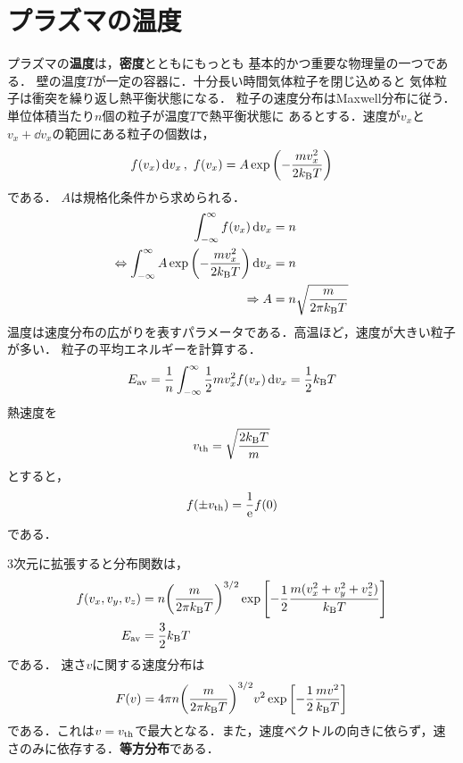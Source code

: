 \documentclass{report}
\begin{document}
  \section{プラズマの温度}
    プラズマの\textbf{温度}は，\textbf{密度}とともにもっとも
    基本的かつ重要な物理量の一つである．
    壁の温度$T$が一定の容器に．十分長い時間気体粒子を閉じ込めると
    気体粒子は衝突を繰り返し熱平衡状態になる．
    粒子の速度分布はMaxwell分布に従う．単位体積当たり$n$個の粒子が温度$T$で熱平衡状態に
    あるとする．速度が$v_x$と$v_x + \dd{v_x}$の範囲にある粒子の個数は，
    \begin{align}
      f(v_x)\dd{v_x},\ f(v_x) = A \exp\qty(-\frac{mv_x^2}{2k_{\mathrm{B}} T})
    \end{align}
    である．
    $A$は規格化条件から求められる．
    \begin{align}
      \int_{-\infty}^{\infty} f(v_x) \dd{v_x} &= n \\
      \Leftrightarrow \int_{-\infty}^{\infty} A \exp\qty(-\frac{mv_x^2}{2k_{\mathrm{B}} T})\dd{v_x} &= n \\ 
      \Rightarrow A &= n\sqrt{\frac{m}{2\pi k_{\mathrm{B}} T}}
    \end{align}
    温度は速度分布の広がりを表すパラメータである．高温ほど，速度が大きい粒子が多い．
    粒子の平均エネルギーを計算する．
    \begin{align}
      E_{\mathrm{av}} = \frac{1}{n}\int_{-\infty}^{\infty} \frac{1}{2}mv_x^2f(v_x) \dd{v_x} = \frac{1}{2}k_{\mathrm{B}} T
    \end{align}
    熱速度を
    \begin{align}
      v_{\mathrm{th}} = \sqrt{\frac{2k_{\mathrm{B}} T}{m}}
    \end{align}
    とすると，
    \begin{align}
      f(\pm v_{\mathrm{th}}) = \frac{1}{\mathrm{e}}f(0)
    \end{align}
    である．
    \par
    3次元に拡張すると分布関数は，
    \begin{align}
      f(v_x, v_y, v_z) &= n\qty(\frac{m}{2\pi k_{\mathrm{B}} T})^{3/2} \exp\qty[-\frac{1}{2}\frac{m(v_x^2 + v_y^2 + v_z^2)}{k_{\mathrm{B}} T}]\\
      E_{\mathrm{av}} &= \frac{3}{2}k_{\mathrm{B}} T
    \end{align}
    である．
    速さ$v$に関する速度分布は
    \begin{align}
      F(v) = 4\pi n \qty(\frac{m}{2\pi k_{\mathrm{B}} T})^{3/2} v^2 \exp\qty[-\frac{1}{2}\frac{mv^2}{k_{\mathrm{B}} T}]
    \end{align}
    である．これは$v = v_{\mathrm{th}}$で最大となる．また，速度ベクトルの向きに依らず，速さのみに依存する．\textbf{等方分布}である．
\end{document}
